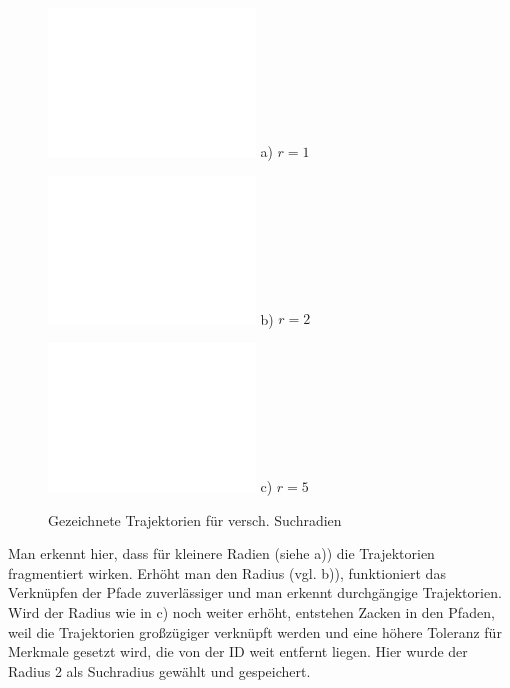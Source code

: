 \newpage
\begin{figure}[h]
\centering
    \includegraphics[width=0.49\textwidth]{images/dummy.png}
    a) $r=1$

    \includegraphics[width=0.49\textwidth]{images/dummy.png}
    b) $r=2$

    \includegraphics[width=0.49\textwidth]{images/dummy.png}
    c) $r=5$
    
\caption{Gezeichnete Trajektorien für versch. Suchradien}
\label{trajektorien_drawn}
\end{figure}
\newpage

Man erkennt hier, dass für kleinere Radien (siehe a)) die Trajektorien fragmentiert wirken. Erhöht man den Radius (vgl. b)), funktioniert das Verknüpfen der Pfade zuverlässiger und man erkennt durchgängige Trajektorien. Wird der Radius wie in c) noch weiter erhöht, entstehen Zacken in den Pfaden, weil die Trajektorien großzügiger verknüpft werden und eine höhere Toleranz für Merkmale gesetzt wird, die von der ID weit entfernt liegen. Hier wurde der Radius 2 als Suchradius gewählt und gespeichert.

